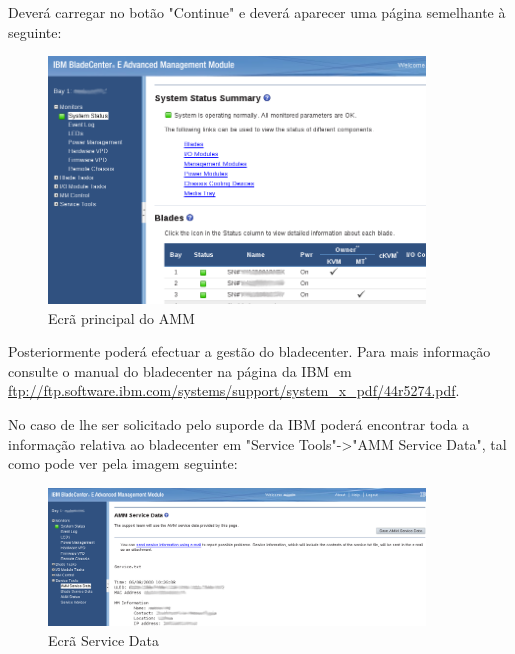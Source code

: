 Deverá carregar no botão "Continue" e deverá aparecer uma página semelhante à seguinte:

\begin{figure}[H]
    \begin{center}
        \includegraphics[width=10cm]{include/img/amm_bladecenterE_3}
    \end{center}
    \caption{Ecrã principal do AMM}
    \label{fig:amm-3}
\end{figure}


Posteriormente poderá efectuar a gestão do bladecenter. Para mais informação consulte o manual do bladecenter na página da IBM em \url{ftp://ftp.software.ibm.com/systems/support/system\_x\_pdf/44r5274.pdf}.

No caso de lhe ser solicitado pelo suporde da IBM poderá encontrar toda a informação relativa ao bladecenter em "Service Tools"->"AMM Service Data", tal como pode ver pela imagem seguinte:

\begin{figure}[H]
    \begin{center}
        \includegraphics[width=10cm]{include/img/amm_bladecenterE_4}
    \end{center}
    \caption{Ecrã Service Data}
    \label{fig:amm-4}
\end{figure}


